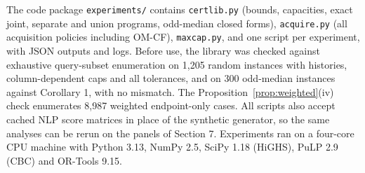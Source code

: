 \documentclass[11pt]{article}
\begin{document}
The code package \texttt{experiments/} contains \texttt{certlib.py} (bounds, capacities, exact joint, separate and union programs, odd-median closed forms), \texttt{acquire.py} (all acquisition policies including OM-CF), \texttt{maxcap.py}, and one script per experiment, with JSON outputs and logs. Before use, the library was checked against exhaustive query-subset enumeration on 1,205 random instances with histories, column-dependent caps and all tolerances, and on 300 odd-median instances against Corollary 1, with no mismatch. The Proposition~\ref{prop:weighted}(iv) check enumerates 8,987 weighted endpoint-only cases. All scripts also accept cached NLP score matrices in place of the synthetic generator, so the same analyses can be rerun on the panels of Section 7. Experiments ran on a four-core CPU machine with Python 3.13, NumPy 2.5, SciPy 1.18 (HiGHS), PuLP 2.9 (CBC) and OR-Tools 9.15.


\end{document}
